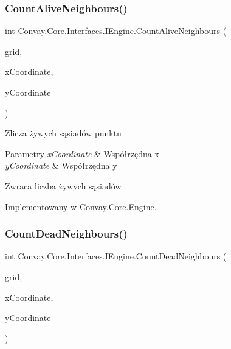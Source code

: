 \subsubsection{\texorpdfstring{Count\+Alive\+Neighbours()}{CountAliveNeighbours()}}
{\footnotesize\ttfamily int Convay.\+Core.\+Interfaces.\+I\+Engine.\+Count\+Alive\+Neighbours (\begin{DoxyParamCaption}\item[{\hyperlink{interface_convay_1_1_core_1_1_interfaces_1_1_i_grid}{I\+Grid}}]{grid,  }\item[{int}]{x\+Coordinate,  }\item[{int}]{y\+Coordinate }\end{DoxyParamCaption})}



Zlicza żywych sąsiadów punktu 


\begin{DoxyParams}{Parametry}
{\em x\+Coordinate} & Współrzędna x\\
\hline
{\em y\+Coordinate} & Współrzędna y\\
\hline
\end{DoxyParams}
\begin{DoxyReturn}{Zwraca}
liczba żywych sąsiadów
\end{DoxyReturn}


Implementowany w \hyperlink{class_convay_1_1_core_1_1_engine_af5d8b7993421d67c3fc6ba702521a7cd}{Convay.\+Core.\+Engine}.

\hypertarget{interface_convay_1_1_core_1_1_interfaces_1_1_i_engine_a4c04381822239d478438ee7012acf9ca}{}\label{interface_convay_1_1_core_1_1_interfaces_1_1_i_engine_a4c04381822239d478438ee7012acf9ca} 
\subsubsection{\texorpdfstring{Count\+Dead\+Neighbours()}{CountDeadNeighbours()}}
{\footnotesize\ttfamily int Convay.\+Core.\+Interfaces.\+I\+Engine.\+Count\+Dead\+Neighbours (\begin{DoxyParamCaption}\item[{\hyperlink{interface_convay_1_1_core_1_1_interfaces_1_1_i_grid}{I\+Grid}}]{grid,  }\item[{int}]{x\+Coordinate,  }\item[{int}]{y\+Coordinate }\end{DoxyParamCaption})}



